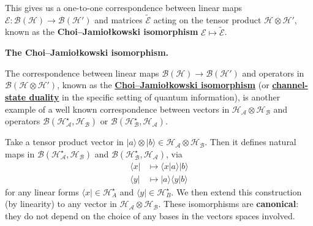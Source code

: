 \documentclass[fleqn,a4paper]{article}
\newenvironment{technical}[1]{\textbf{#1.}\par\vspace{.5\baselineskip}\everypar{\setlength{\parindent}{1.5em}}}{}
\theoremstyle{definition}
\theoremstyle{definition}
\theoremstyle{definition}
\theoremstyle{definition}
\theoremstyle{remark}
\begin{document}
This gives us a one-to-one correspondence between linear maps \(\mathcal{E}\colon\mathcal{B}(\mathcal{H})\to\mathcal{B}(\mathcal{H}')\) and matrices \(\widetilde{\mathcal{E}}\) acting on the tensor product \(\mathcal{H}\otimes\mathcal{H}'\), known as the \textbf{Choi--Jamiołkowski isomorphism} \(\mathcal{E}\mapsto\widetilde{\mathcal{E}}\).

\begin{technical}{The Choi–Jamiołkowski isomorphism}
The correspondence between linear maps \(\mathscr{B}(\mathcal{H})\to\mathscr{B}(\mathcal{H'})\) and operators in \(\mathscr{B}(\mathcal{H}\otimes\mathcal{H'})\), known as the \href{https://en.wikipedia.org/wiki/Choi\%E2\%80\%93Jamio\%C5\%82kowski_isomorphism}{\textbf{Choi--Jamiołkowski isomorphism}} (or \href{https://en.wikipedia.org/wiki/Channel-state_duality}{\textbf{channel-state duality}} in the specific setting of quantum information), is another example of a well known correspondence between vectors in \(\mathcal{H}_{\mathcal{A}}\otimes\mathcal{H}_{\mathcal{B}}\) and operators \(\mathscr{B}(\mathcal{H}_{\mathcal{A}}^\star,\mathcal{H}_{\mathcal{B}})\) or \(\mathscr{B}(\mathcal{H}_{\mathcal{B}}^\star,\mathcal{H}_{\mathcal{A}})\).

Take a tensor product vector in \(|a\rangle\otimes|b\rangle\in \mathcal{H}_{\mathcal{A}}\otimes\mathcal{H}_{\mathcal{B}}\).
Then it defines natural maps in \(\mathscr{B}(\mathcal{H}_{\mathcal{A}}^\star,\mathcal{H}_{\mathcal{B}})\) and \(\mathscr{B}(\mathcal{H}_{\mathcal{B}}^\star,\mathcal{H}_{\mathcal{A}})\), via
\[
  \begin{aligned}
    \langle x|
    &\longmapsto \langle x|a\rangle|b\rangle
  \\\langle y|
    &\longmapsto |a\rangle\langle y|b\rangle
  \end{aligned}
\]
for any linear forms \(\langle x|\in\mathcal{H}^\star_A\) and \(\langle y|\in\mathcal{H}^\star_B\).
We then extend this construction (by linearity) to any vector in \(\mathcal{H}_{\mathcal{A}}\otimes\mathcal{H}_{\mathcal{B}}\).
These isomorphisms are \textbf{canonical}: they do not depend on the choice of any bases in the vectors spaces involved.


\end{technical}
\end{document}
